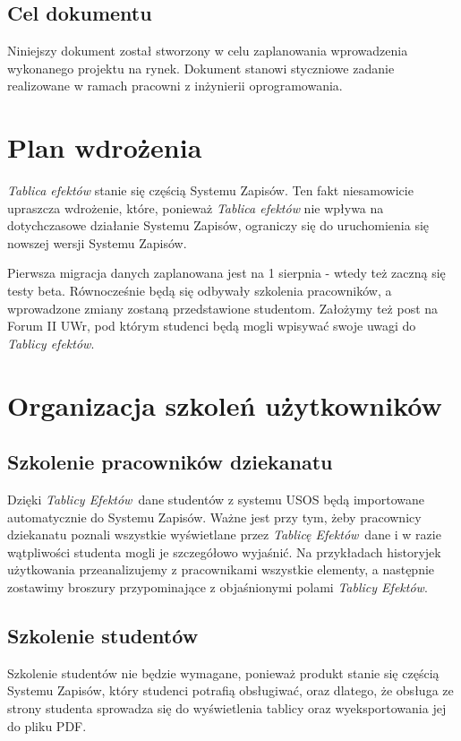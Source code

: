\documentclass{article}
\newcommand{\TyE}{\textit{Tablicy Efektów}}
\newcommand{\TeE}{\textit{Tablicę Efektów}}
\begin{document}
\subsection{Cel dokumentu}
Niniejszy dokument został stworzony w celu zaplanowania wprowadzenia wykonanego projektu na rynek.
Dokument stanowi styczniowe zadanie realizowane w ramach pracowni z inżynierii oprogramowania.


\section{Plan wdrożenia}
\textit{Tablica efektów} stanie się częścią Systemu Zapisów.
Ten fakt niesamowicie upraszcza wdrożenie, które, ponieważ \textit{Tablica efektów} nie wpływa na dotychczasowe działanie Systemu Zapisów, ograniczy się do uruchomienia się nowszej wersji Systemu Zapisów.

Pierwsza migracja danych zaplanowana jest na 1 sierpnia - wtedy też zaczną się testy beta.
Równocześnie będą się odbywały szkolenia pracowników, a wprowadzone zmiany zostaną przedstawione studentom.
Założymy też post na Forum II UWr, pod którym studenci będą mogli wpisywać swoje uwagi do \textit{Tablicy efektów}.

\section{Organizacja szkoleń użytkowników}

\subsection{Szkolenie pracowników dziekanatu}
Dzięki \TyE\ dane studentów z systemu USOS będą importowane automatycznie do Systemu Zapisów. Ważne jest przy tym, żeby pracownicy dziekanatu poznali wszystkie 
wyświetlane przez \TeE\ dane i w razie wątpliwości studenta mogli je szczegółowo wyjaśnić. Na przykładach historyjek użytkowania przeanalizujemy z pracownikami wszystkie
elementy, a następnie zostawimy broszury przypominające z objaśnionymi polami \TyE.

\subsection{Szkolenie studentów}
Szkolenie studentów nie będzie wymagane, ponieważ produkt stanie się częścią Systemu Zapisów, który studenci potrafią obsługiwać, oraz dlatego, że obsługa ze strony studenta sprowadza się do wyświetlenia tablicy oraz wyeksportowania jej do pliku PDF.
\end{document}
